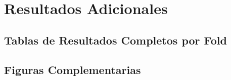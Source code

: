 
\chapter{Resultados Adicionales}


\section{Tablas de Resultados Completos por Fold}

\section{Figuras Complementarias}
